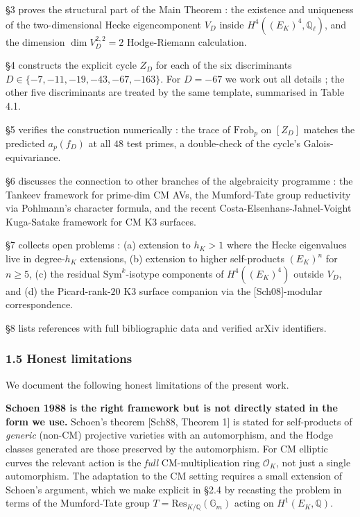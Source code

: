 \documentclass[
  11pt,
  a4paper,
]{amsart}
\begin{document}
§3 proves the structural part of the Main Theorem : the existence and uniqueness of the two-dimensional Hecke eigencomponent \(V_D\) inside \(H^4((E_K)^4, \mathbb{Q}_\ell)\), and the dimension \(\dim V_D^{2,2} = 2\) Hodge-Riemann calculation.

§4 constructs the explicit cycle \(Z_D\) for each of the six discriminants \(D \in \{-7,-11,-19,-43,-67,-163\}\). For \(D = -67\) we work out all details ; the other five discriminants are treated by the same template, summarised in Table 4.1.

§5 verifies the construction numerically : the trace of \(\mathrm{Frob}_p\) on \([Z_D]\) matches the predicted \(a_p(f_D)\) at all \(48\) test primes, a double-check of the cycle's Galois-equivariance.

§6 discusses the connection to other branches of the algebraicity programme : the Tankeev framework for prime-dim CM AVs, the Mumford-Tate group reductivity via Pohlmann's character formula, and the recent Costa-Elsenhans-Jahnel-Voight Kuga-Satake framework for CM K3 surfaces.

§7 collects open problems : (a) extension to \(h_K > 1\) where the Hecke eigenvalues live in degree-\(h_K\) extensions, (b) extension to higher self-products \((E_K)^n\) for \(n \geq 5\), (c) the residual \(\mathrm{Sym}^k\)-isotype components of \(H^4((E_K)^4)\) outside \(V_D\), and (d) the Picard-rank-\(20\) K3 surface companion via the {[}Sch08{]}-modular correspondence.

§8 lists references with full bibliographic data and verified arXiv identifiers.

\hypertarget{honest-limitations}{%
\subsubsection{1.5 Honest limitations}\label{honest-limitations}}

We document the following honest limitations of the present work.

\textbf{Schoen 1988 is the right framework but is not directly stated in the form we use.} Schoen's theorem {[}Sch88, Theorem 1{]} is stated for self-products of \emph{generic} (non-CM) projective varieties with an automorphism, and the Hodge classes generated are those preserved by the automorphism. For CM elliptic curves the relevant action is the \emph{full} CM-multiplication ring \(\mathcal{O}_K\), not just a single automorphism. The adaptation to the CM setting requires a small extension of Schoen's argument, which we make explicit in §2.4 by recasting the problem in terms of the Mumford-Tate group \(T = \mathrm{Res}_{K/\mathbb{Q}}(\mathbb{G}_m)\) acting on \(H^1(E_K, \mathbb{Q})\).
\end{document}
